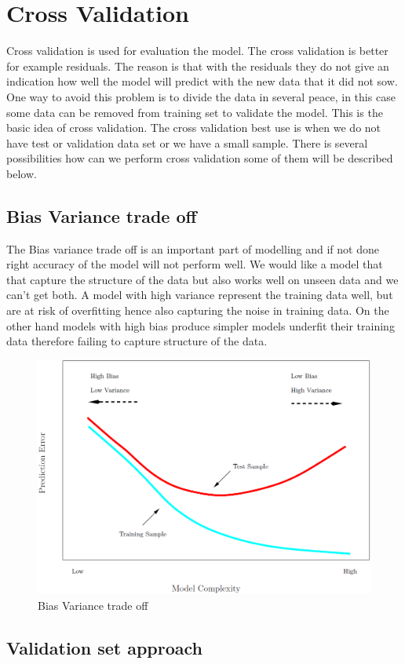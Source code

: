 \chapter{Cross Validation} \label{ch:crossValidation}
Cross validation is used for evaluation the model. The cross validation is better for example residuals. The reason is that with the residuals they do not give an indication how well the model will predict with the new data that it did not sow. One way to avoid this problem is to divide the data in several peace, in this case some data can be removed from training set to validate the model. This is the basic idea of cross validation. The cross validation best use is when we do not have test or validation data set or we have a small sample. There is several possibilities how can we perform cross validation some of them will be described below.

\section {Bias Variance trade off}
The Bias variance trade off is an important part of modelling and if not done right accuracy of the model will not perform well. We would like a model that that capture the structure of the data but also works well on unseen data and we can't get both. A model with high variance represent the training data well, but are at risk of overfitting hence also capturing the noise in training data. On the other hand models with high bias produce simpler models underfit their training data therefore failing to capture structure of the data.

\begin{figure}[h]
	\centering
	\includegraphics[width=0.5\linewidth]{crossValidation/biasVariance}
	\caption{Bias Variance trade off}
	\label{fig:biasvariance}
\end{figure}

\section {Validation set approach}
